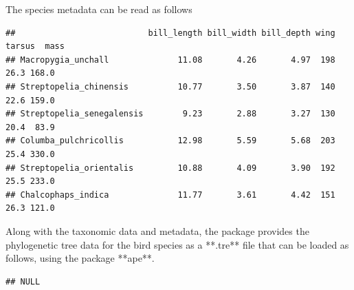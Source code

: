 \documentclass[12pt]{article}
\begin{document}
The species metadata can be read as follows

\begin{knitrout}
\color{fgcolor}\begin{kframe}
\begin{alltt}
 \hlkwb{<-} \hlstd{(}
\end{alltt}
\begin{verbatim}
##                           bill_length bill_width bill_depth wing tarsus  mass
## Macropygia_unchall              11.08       4.26       4.97  198   26.3 168.0
## Streptopelia_chinensis          10.77       3.50       3.87  140   22.6 159.0
## Streptopelia_senegalensis        9.23       2.88       3.27  130   20.4  83.9
## Columba_pulchricollis           12.98       5.59       5.68  203   25.4 330.0
## Streptopelia_orientalis         10.88       4.09       3.90  192   25.5 233.0
## Chalcophaps_indica              11.77       3.61       4.42  151   26.3 121.0
\end{verbatim}
\end{kframe}
\end{knitrout}


Along with the taxonomic data and metadata, the package provides the phylogenetic tree data for the bird species as a **.tre** file that can be loaded as follows, using the package **ape**.

\begin{knitrout}
\color{fgcolor}\begin{kframe}
\begin{alltt}
 \hlkwb{<-} \hlopt{::}\hlstd{(}\hlstd{(}\hlstd{,} \hlstd{,}
                              \hlstd{=} \hlstd{))}
\end{alltt}


{\ttfamily\noindent{}}\begin{alltt}
\end{alltt}
\begin{verbatim}
## NULL
\end{verbatim}
\end{kframe}
\end{knitrout}
\end{document}
